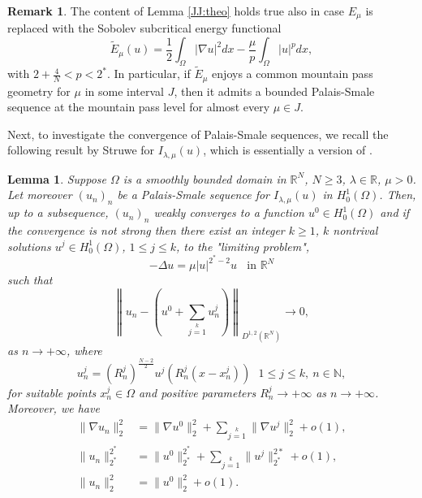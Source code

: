 \documentclass[10pt]{article}
\newcommand{\N}{\mathbb{N}}
\newcommand{\R}{\mathbb{R}}
\newtheorem{lemma}[proposition]{Lemma}
\theoremstyle{definition}
\newtheorem{remark}[proposition]{Remark}
\numberwithin{equation}{section}
\begin{document}
%
\begin{remark}\label{rmk:trick_for_p}
The content of Lemma \ref{JJ:theo} holds true also in case $E_\mu$ is replaced with the Sobolev subcritical energy functional
\begin{equation}\label{eq:subcrit_energy}
\tilde E_{\mu}(u)=\frac{1}{2}\int_{\Omega}|\nabla u|^{2}dx-\frac{\mu}{p}\int_{\Omega}|u|^{p}dx,
\end{equation}
with $2+\frac4N < p < 2^*$. In particular, if $\tilde E_\mu$ enjoys a common mountain pass geometry 
for $\mu$ in some interval $J$, then it admits a bounded Palais-Smale sequence at the mountain pass 
level for almost every $\mu\in J$.
\end{remark}

Next, to investigate the convergence of Palais-Smale sequences, we recall the following result
by Struwe for $I_{\lambda,\mu}(u)$, which is essentially a version of \cite[Ch. III, Thm. 3.1]{Struwebook}.
\begin{lemma}\label{split}
Suppose $\Omega$ is a smoothly bounded domain in $\mathbb{R}^{N}$, $N\geq3$, $\lambda\in\R$, $\mu>0$.
Let moreover $(u_{n})_{n}$ be a Palais-Smale sequence for $I_{\lambda,\mu}(u)$ in $H^{1}_{0}(\Omega)$. Then, up to a subsequence, $(u_{n})_n$ weakly converges to a function $u^{0}\in H^{1}_{0}(\Omega)$ and if the convergence is not strong then there exist an integer $k\geq1$, $k$ nontrival solutions $u^{j}\in H^{1}_{0}(\Omega)$, $1\leq j\leq k$, to the "limiting problem",
\begin{equation}\label{pro:lim}
-\Delta u = \mu |u|^{2^{*}-2}u \ \ \ \ \mbox{in } \mathbb{R}^{N}
\end{equation}
such that
\[
\left\|u_{n}-\left(u^{0}+\sum\limits_{j=1}\limits^{k}u^{j}_{n}\right)\right\|_{D^{1,2}(\R^N)}\to0,
\]
as $n\to+\infty$, where
\[u^{j}_{n}=(R_{n}^{j})^{\frac{N-2}{2}}u^{j}(R_{n}^{j}(x-x_{n}^{j})) \ \ \ 1\leq j \leq k, \ n\in \N,\]
for suitable points $x_{n}^{j}\in \Omega$ and positive parameters $R_{n}^{j}\rightarrow+\infty$ as $n\rightarrow+\infty$. Moreover, we have
\[
\begin{split}
\|\nabla u_{n}\|_{2}^{2}&=\|\nabla u^{0}\|_{2}^{2}+\sum\limits_{j=1}\limits^{k}\|\nabla u^{j}\|_{2}^{2}+o(1),\\
\| u_{n}\|_{2^*}^{2^*}&=\| u^{0}\|_{2^*}^{2^*}+\sum\limits_{j=1}\limits^{k}\| u^{j}\|_{2^*}^{2*}+o(1),\\
\| u_{n}\|_{2}^{2}&=\| u^{0}\|_{2}^{2}+o(1).
\end{split}
\]
\end{lemma}
%
\end{document}

